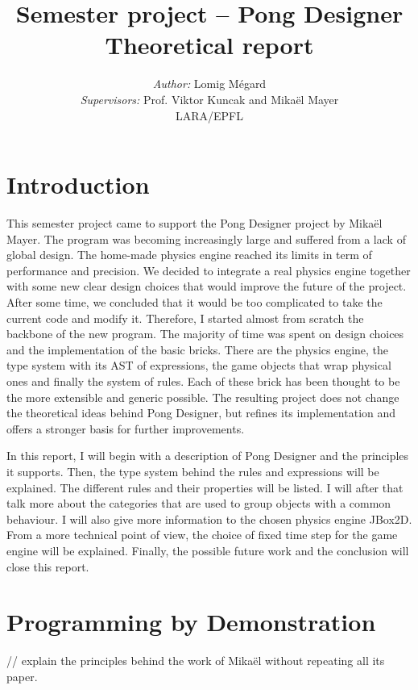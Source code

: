 \documentclass[11pt,a4paper]{article}
\title{Semester project -- Pong Designer\\Theoretical report}
\author{\textit{Author:} Lomig Mégard\\
\textit{Supervisors:} Prof. Viktor Kuncak and Mikaël Mayer\vspace*{0.5cm}\\
\textsc{LARA/EPFL}}
\begin{document}
\maketitle

\section{Introduction}
This semester project came to support the Pong Designer project by Mikaël Mayer. The program was becoming increasingly large and suffered from a lack of global design. The home-made physics engine reached its limits in term of performance and precision. We decided to integrate a real physics engine together with some new clear design choices that would improve the future of the project. After some time, we concluded that it would be too complicated to take the current code and modify it. Therefore, I started almost from scratch the backbone of the new program. The majority of time was spent on design choices and the implementation of the basic bricks. There are the physics engine, the type system with its AST of expressions, the game objects that wrap physical ones and finally the system of rules. Each of these brick has been thought to be the more extensible and generic possible. The resulting project does not change the theoretical ideas behind Pong Designer, but refines its implementation and offers a stronger basis for further improvements.

In this report, I will begin with a description of Pong Designer and the principles it supports. Then, the type system behind the rules and expressions will be explained. The different rules and their properties will be listed. I will after that talk more about the categories that are used to group objects with a common behaviour. I will also give more information to the chosen physics engine JBox2D. From a more technical point of view, the choice of fixed time step for the game engine will be explained. Finally, the possible future work and the conclusion will close this report.

\section{Programming by Demonstration}

// explain the principles behind the work of Mikaël without repeating all its paper. 
\end{document}
